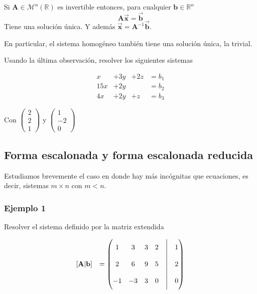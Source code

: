 \documentclass[
]{article}
\begin{document}
Si \(\mathbf{A}\in\mathcal{M}^{n}(\mathbb{R})\) es invertible entonces,
para cualquier \(\mathbf{b}\in\mathbb{R}^{n}\) \[
\mathbf{A}\vec{\mathbf{x}} = \vec{\mathbf{b}}
\] Tiene una solución única. Y además
\(\vec{\mathbf{x}} = \mathbf{A}^{-1}\vec{\mathbf{b}}\).

En particular, el sistema homogéneo también tiene una solución única, la
trivial.

Usando la última observación, resolver los siguientes sistemas

\begin{equation*}
  \begin{matrix}
           x   & +3 y  &+2z  & = b_1  \\
           15x & +2 y &  & = b_2   \\
           4x & +2 y &  +z & = b_3
  \end{matrix}
\end{equation*}

Con \(\begin{pmatrix}2 \\ 2 \\1 \end{pmatrix}\) y
\(\begin{pmatrix}1 \\ -2 \\0 \end{pmatrix}\)

\hypertarget{forma-escalonada-y-forma-escalonada-reducida}{%
\subsection{Forma escalonada y forma escalonada
reducida}\label{forma-escalonada-y-forma-escalonada-reducida}}

Estudiamos brevemente el caso en donde hay más incógnitas que
ecuaciones, es decir, sistemas \(m\times n\) con \(m<n\).

\hypertarget{ejemplo-1-2}{%
\subsubsection{Ejemplo 1}\label{ejemplo-1-2}}

Resolver el sistema definido por la matriz extendida

\begin{equation*}
 \begin{array}{cc}
  [\mathbf{A}| \mathbf{b}] & = \begin{pmatrix}
                                  1   &   3 &   3  & 2 &\biggm| & 1  \\
                                  2   &   6 &   9  & 5 &\biggm| & 2   \\
                                 -1   &  -3 &   3  & 0 &\biggm| & 0
                                \end{pmatrix}
 \end{array}
\end{equation*}
\end{document}
